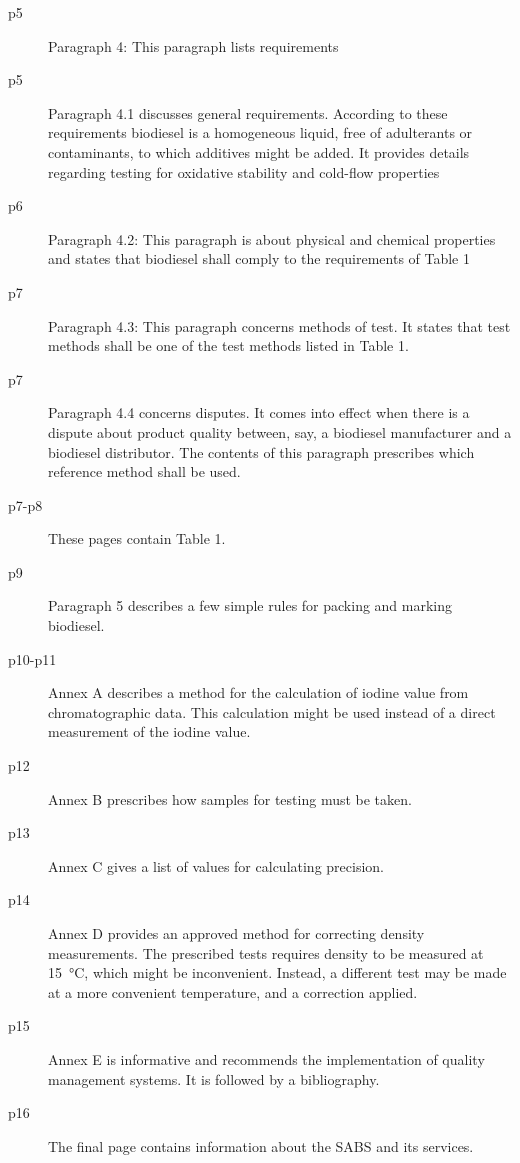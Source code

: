 \begin{description}
\item[p5]{Paragraph 4: This paragraph lists requirements} 

\item[p5]{Paragraph 4.1 discusses general requirements. According to these
requirements biodiesel is a homogeneous liquid, free of adulterants or
contaminants, to which additives might be added. It provides details regarding
testing for oxidative stability and cold-flow properties}

\item[p6]{Paragraph 4.2: This paragraph is about physical and chemical
properties and states that biodiesel shall comply to the requirements of Table
1}

\item[p7]{Paragraph 4.3: This paragraph concerns methods of test. It states that
test methods shall be  one of the test methods listed in Table 1.}

\item[p7]{Paragraph 4.4 concerns disputes. It comes into effect when there is a
dispute about product quality between, say, a biodiesel manufacturer and a
biodiesel distributor. The contents of this paragraph prescribes which reference
method shall be used.}

\item[p7-p8]{These pages contain Table 1.}

\item[p9]{Paragraph 5 describes a few simple rules for packing and marking biodiesel.}

\item[p10-p11]{Annex A describes a method for the calculation of iodine value
from chromatographic data. This calculation might be used instead of a direct
measurement of the iodine value.}

\item[p12]{Annex B prescribes how samples for testing must be taken.}

\item[p13]{Annex C gives a list of values for calculating precision.}

\item[p14]{Annex D provides an approved method for correcting density
measurements. The prescribed tests requires density to be measured at
\SI{15}{\celsius}, which might be inconvenient. Instead, a different test may be
made at a more convenient temperature, and a correction applied. }

\item[p15]{Annex E is informative and recommends the implementation of quality
management systems. It is followed by a bibliography.}

\item[p16]{The final page contains information about the SABS and its services.}

\end{description} 

